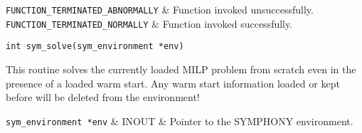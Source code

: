 \returns
{}
{\tt FUNCTION\_TERMINATED\_ABNORMALLY} & Function invoked unsuccessfully. \\
{\tt FUNCTION\_TERMINATED\_NORMALLY} & Function invoked successfully.\\
\et
\ed
\vspace{1ex}


\label{sym_solve}
\begin{verbatim}
int sym_solve(sym_environment *env)
\end{verbatim}

\bd
\describe

This routine solves the currently loaded MILP problem from scratch even in the
presence of a loaded warm start. Any warm start information loaded or kept
before will be deleted from the environment!

\args

{\tt }
{\tt sym\_environment *env} & INOUT & Pointer to the SYMPHONY environment.
\et

\returns


